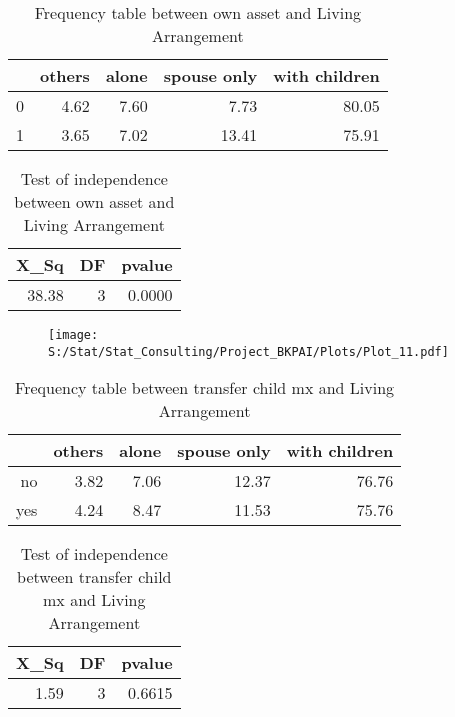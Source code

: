 \documentclass[11pt]{article}
\begin{document}
\begin{table}[H]
\centering
\begin{tabular}{rrrrr}
  \hline
 & others & alone & spouse only & with children \\ 
  \hline
0 & 4.62 & 7.60 & 7.73 & 80.05 \\ 
  1 & 3.65 & 7.02 & 13.41 & 75.91 \\ 
   \hline
\end{tabular}
\caption{Frequency table between own asset and Living Arrangement} 
\end{table}
\begin{table}[H]
\centering
\begin{tabular}{rrr}
  \hline
X\_Sq & DF & pvalue \\ 
  \hline
38.38 & 3 & 0.0000 \\ 
   \hline
\end{tabular}
\caption{Test of independence between own asset and Living Arrangement} 
\end{table}
\begin{center}
\begin{figure}[H]
\texttt{[image: S:/Stat/Stat\_Consulting/Project\_BKPAI/Plots/Plot\_11.pdf]}

\end{figure}
\end{center}
\begin{table}[H]
\centering
\begin{tabular}{rrrrr}
  \hline
 & others & alone & spouse only & with children \\ 
  \hline
no & 3.82 & 7.06 & 12.37 & 76.76 \\ 
  yes & 4.24 & 8.47 & 11.53 & 75.76 \\ 
   \hline
\end{tabular}
\caption{Frequency table between transfer child mx and Living Arrangement} 
\end{table}
\begin{table}[H]
\centering
\begin{tabular}{rrr}
  \hline
X\_Sq & DF & pvalue \\ 
  \hline
1.59 & 3 & 0.6615 \\ 
   \hline
\end{tabular}
\caption{Test of independence between transfer child mx and Living Arrangement} 
\end{table}
\end{document}

